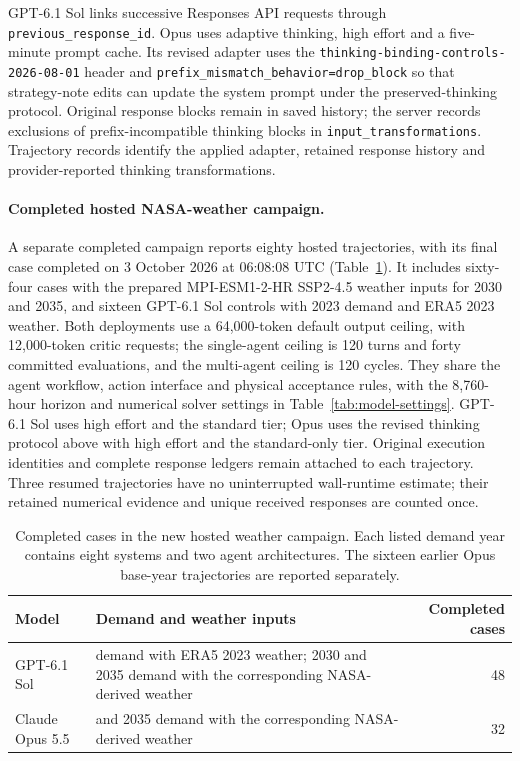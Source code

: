 \documentclass[pdflatex,sn-nature]{sn-jnl}
\begin{document}
\begin{appendices}
GPT-6.1 Sol links successive Responses API requests through \texttt{previous\_response\_id}. Opus uses adaptive thinking, high effort and a five-minute prompt cache. Its revised adapter uses the \texttt{thinking-binding-controls-2026-08-01} header and \texttt{prefix\_mismatch\_behavior=drop\_block} so that strategy-note edits can update the system prompt under the preserved-thinking protocol\cite{anthropic2026preservedthinking}. Original response blocks remain in saved history; the server records exclusions of prefix-incompatible thinking blocks in \texttt{input\_transformations}. Trajectory records identify the applied adapter, retained response history and provider-reported thinking transformations.

\paragraph{Completed hosted NASA-weather campaign.}
A separate completed campaign reports eighty hosted trajectories, with its final case completed on 3 October 2026 at 06:08:08 UTC (Table~\ref{tab:nasa-model-settings}). It includes sixty-four cases with the prepared MPI-ESM1-2-HR SSP2-4.5 weather inputs for 2030 and 2035, and sixteen GPT-6.1 Sol controls with 2023 demand and ERA5 2023 weather. Both deployments use a 64,000-token default output ceiling, with 12,000-token critic requests; the single-agent ceiling is 120 turns and forty committed evaluations, and the multi-agent ceiling is 120 cycles. They share the agent workflow, action interface and physical acceptance rules, with the 8,760-hour horizon and numerical solver settings in Table~\ref{tab:model-settings}. GPT-6.1 Sol uses high effort and the standard tier; Opus uses the revised thinking protocol above with high effort and the standard-only tier. Original execution identities and complete response ledgers remain attached to each trajectory. Three resumed trajectories have no uninterrupted wall-runtime estimate; their retained numerical evidence and unique received responses are counted once.

\begin{table}[htbp]
\caption{Completed cases in the new hosted weather campaign. Each listed demand year contains eight systems and two agent architectures. The sixteen earlier Opus base-year trajectories are reported separately.}
\label{tab:nasa-model-settings}
\centering\small
\begin{tabularx}{\textwidth}{@{}l>{\raggedright\arraybackslash}Xr@{}}
\toprule
Model & Demand and weather inputs & Completed cases\\
\midrule
GPT-6.1 Sol & 2023 demand with ERA5 2023 weather; 2030 and 2035 demand with the corresponding NASA-derived weather & 48\\
Claude Opus 5.5 & 2030 and 2035 demand with the corresponding NASA-derived weather & 32\\
\bottomrule
\end{tabularx}
\end{table}

\end{appendices}
\end{document}
